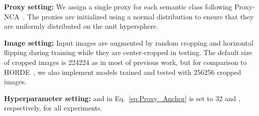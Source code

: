\documentclass[10pt,twocolumn,letterpaper]{article}
\begin{document}
\vspace{1mm}
\noindent \textbf{Proxy setting:}
We assign a single proxy for each semantic class following Proxy-NCA~\cite{movshovitz2017no}.
The proxies are initialized using a normal distribution to ensure that they are uniformly distributed on the unit hypersphere.

\vspace{1mm}
\noindent \textbf{Image setting:} Input images are augmented by random cropping and horizontal flipping during training while they are center-cropped in testing. 
The default size of cropped images is 224224 as in most of previous work, but for comparison to HORDE~\cite{JACOB_2019_ICCV}, we also implement models trained and tested with 256256 cropped images.

\vspace{1mm}
\noindent \textbf{Hyperparameter setting:}  and  in Eq.~\eqref{eq:Proxy_Anchor} is set to 32 and , respectively, for all experiments. 
\end{document}
